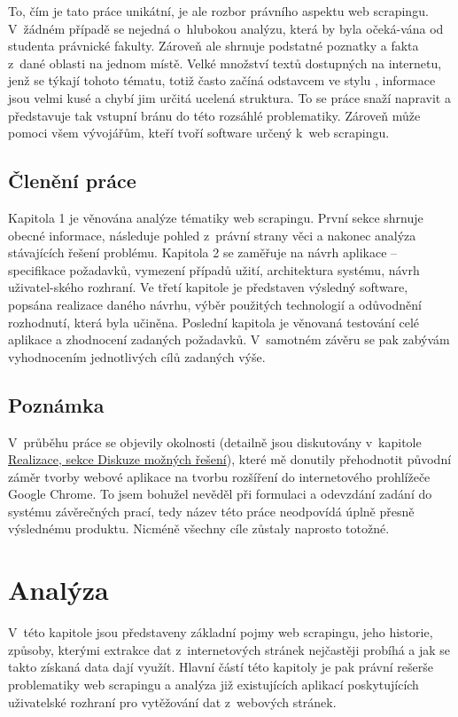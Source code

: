 \documentclass[thesis=B,czech]{FITthesis}[2012/06/26]
\begin{document}
\begin{introduction}
	To, čím je tato práce unikátní, je ale rozbor právního aspektu web scrapingu. V~žádném případě se nejedná o~hlubokou analýzu, která by byla očeká-vána od studenta právnické fakulty. Zároveň ale shrnuje podstatné poznatky a fakta z~dané oblasti na jednom místě. Velké množství textů dostupných na internetu, jenž se týkají tohoto tématu, totiž často začíná odstavcem ve stylu , informace jsou velmi kusé a chybí jim určitá ucelená struktura. To se práce snaží napravit a představuje tak vstupní bránu do této rozsáhlé problematiky. Zároveň může pomoci všem vývojářům, kteří tvoří software určený k~web scrapingu.
	
	\section*{Členění práce}
	Kapitola 1 je věnována analýze tématiky web scrapingu. První sekce shrnuje obecné informace, následuje pohled z~právní strany věci a nakonec analýza stávajících řešení problému. Kapitola 2 se zaměřuje na návrh aplikace -- specifikace požadavků, vymezení případů užití, architektura systému, návrh uživatel-ského rozhraní. Ve třetí kapitole je představen výsledný software, popsána realizace daného návrhu, výběr použitých technologií a odůvodnění rozhodnutí, která byla učiněna. Poslední kapitola je věnovaná testování celé aplikace a zhodnocení zadaných požadavků. V~samotném závěru se pak zabývám vyhodnocením jednotlivých cílů zadaných výše.
	
	\section*{Poznámka}
	V~průběhu práce se objevily okolnosti (detailně jsou diskutovány v~kapitole \hyperref[sec:possible_solutions]{Realizace, sekce Diskuze možných řešení}), které mě donutily přehodnotit původní záměr tvorby webové aplikace na tvorbu rozšíření do internetového prohlížeče Google Chrome. To jsem bohužel nevěděl při formulaci a odevzdání zadání do systému závěrečných prací, tedy název této práce neodpovídá úplně přesně výslednému produktu. Nicméně všechny cíle zůstaly naprosto totožné.
\end{introduction}




\chapter{Analýza}
V~této kapitole jsou představeny základní pojmy web scrapingu, jeho historie, způsoby, kterými extrakce dat z~internetových stránek nejčastěji probíhá a jak se takto získaná data dají využít. Hlavní částí této kapitoly je pak právní rešerše problematiky web scrapingu a analýza již existujících aplikací poskytujících uživatelské rozhraní pro vytěžování dat z~webových stránek.
\end{document}
